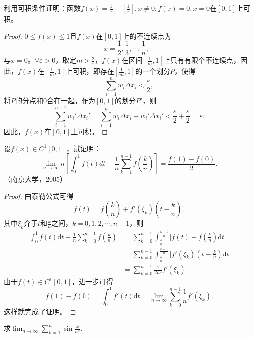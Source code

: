 \begin{example}
   利用可积条件证明：函数$f(x)=\frac1x-[\frac1x],x\neq0;f(x)=0,x=0$在$[0,1]$上可积。
\end{example}

\begin{proof}
     $0\leq f(x)\leq1$且$f(x)$在$[0,1]$上的不连续点为$$x=\frac{1}{2},\frac{1}{3},\cdots,\frac{1}{n},\cdots$$与$x=0$。$\forall\varepsilon>0$，取定$m>\frac{2}{\varepsilon}$，$f(x)$在区间$[\frac{1}{m},1]$上只有有限个不连续点，因此，$f(x)$在$[\frac{1}{m},1]$上可积，即存在$[\frac{1}{m},1]$的一个划分$P$，使得
  $$\sum_{i=1}^nw_i\Delta x_i<\frac{\varepsilon}{2},$$
  将$P$的分点和$0$合在一起，作为$[0,1]$的划分$P'$，则
  $$\sum_{i=1}^{n+1}w_i'\Delta x_i'=\sum_{i=1}^nw_i\Delta x_i+w_i'\Delta x_i'<\frac{\varepsilon}{2}+\frac{\varepsilon}{2}=\varepsilon.$$
  因此，$f(x)$在$[0,1]$上可积。
\end{proof}

\begin{example}
 设$f(x)\in C^1[0,1]$，试证明：$$\displaystyle\lim_{n\rightarrow\infty}n[\int_0^1f(t)dt-\frac1n\sum_{k=1}^{n-1}f(\frac kn)]=\frac{f(1)-f(0)}2.$$
 （南京大学，2005）
\end{example}

\begin{proof}
  由泰勒公式可得
$$f(t)=f(\frac{k}{n})+f'(\xi_k)(t-\frac{k}{n}),$$
其中$\xi_k$介于$t$和$\frac{k}{n}$之间，$k=0,1,2,\cdots,n-1$，则
\begin{align*}
\int_0^1f(t)\mathrm{d}t-\frac{1}{n}\sum_{k=0}^{n-1}f(\frac{k}{n})
&=\sum_{k=0}^{n-1}\int_{\frac{k}{n}}^{\frac{k+1}{n}}[f(t)-f(\frac{k}{n})\mathrm{d}t\\
&=\sum_{k=0}^{n-1}\int_{\frac{k}{n}}^{\frac{k+1}{n}}[f'(\xi_k)(t-\frac{k}{n})\mathrm{d}t\\
&=\sum_{k=0}^{n-1}\frac{1}{2n^2}f'(\xi_k)
\end{align*}
由于$f(t)\in C^1[0,1]$，进一步可得
$$f(1)-f(0)=\int_0^1f'(t)\mathrm{d}t=\lim_{n\rightarrow\infty}\sum_{k=0}^{n-1}\frac{1}{n}f'(\xi_k).$$
这样就完成了证明。
\end{proof}

\begin{example}
 求$\displaystyle\lim_{n\rightarrow\infty}\sum_{k=1}^n\sin\frac k{n^2}$.
\end{example}

